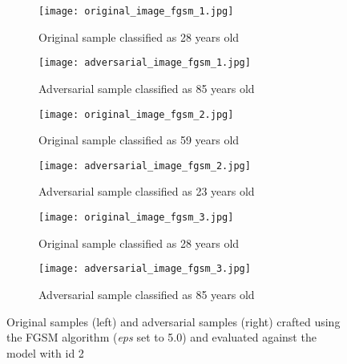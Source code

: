 \begin{figure}

\begin{subfigure}{.5\textwidth}
  \centering
  \texttt{[image: original\_image\_fgsm\_1.jpg]}
  \caption{Original sample classified as 28 years old}
\end{subfigure}
\begin{subfigure}{.5\textwidth}
  \centering
  \texttt{[image: adversarial\_image\_fgsm\_1.jpg]}
  \caption{Adversarial sample classified as 85 years old}
\end{subfigure}

\begin{subfigure}{.5\textwidth}
  \centering
  \texttt{[image: original\_image\_fgsm\_2.jpg]}
  \caption{Original sample classified as 59 years old}
\end{subfigure}
\begin{subfigure}{.5\textwidth}
  \centering
  \texttt{[image: adversarial\_image\_fgsm\_2.jpg]}
  \caption{Adversarial sample classified as 23 years old}
\end{subfigure}

\begin{subfigure}{.5\textwidth}
  \centering
  \texttt{[image: original\_image\_fgsm\_3.jpg]}
  \caption{Original sample classified as 28 years old}
\end{subfigure}
\begin{subfigure}{.5\textwidth}
  \centering
  \texttt{[image: adversarial\_image\_fgsm\_3.jpg]}
  \caption{Adversarial sample classified as 85 years old}
\end{subfigure}

\caption{Original samples (left) and adversarial samples (right) crafted using the FGSM algorithm (\textit{eps} set to 5.0) and evaluated against the model with id 2}
\label{fig:fgsm-attack}
\end{figure}

